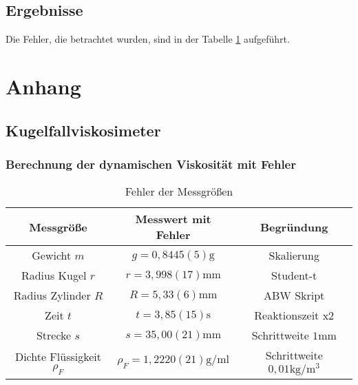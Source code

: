 \documentclass[11pt, a4paper]{article}
\begin{document}
    \subsection{Ergebnisse}

    Die Fehler, die betrachtet wurden, sind in der Tabelle \ref{tab:errors} aufgeführt.



    \section{Anhang}
    \subsection{Kugelfallviskosimeter}

    \subsubsection{Berechnung der dynamischen Viskosität mit Fehler}
    
    \begin{table}
       \begin{adjustwidth}{-5cm}{-5cm}
            \centering
            \begin{tabular}{c c c}
                Messgröße & Messwert mit Fehler & Begründung \\ \hline
                
                Gewicht $m$ & $g = 0,8445(5) \si{\gram}$ & Skalierung \\
                Radius Kugel $r$ & $r = 3,998(17) \si{\milli\meter}$ & Student-t \\
                Radius Zylinder $R$ & $R = 5,33(6) \si{\milli\meter}$ & ABW Skript \cite[Tabelle 6]{ABW} \\
                Zeit $t$ & $t = 3,85(15) \si{\second}$ & Reaktionszeit x2\\
                Strecke $s$ & $s = 35,00(21) \si{\milli\metre}$ & Schrittweite $1 \si{\milli\metre}$ \\
                Dichte Flüssigkeit $\rho_F$ & $\rho_F = 1,2220(21)  \si{\gram\per\milli\litre}$ & Schrittweite $0,01 \si{\kilogram\per\cubic\metre}$ \\

            \end{tabular}
        \end{adjustwidth}
        \label{tab:errors}
        \caption[]{Fehler der Messgrößen}
    \end{table}
    
\end{document}

